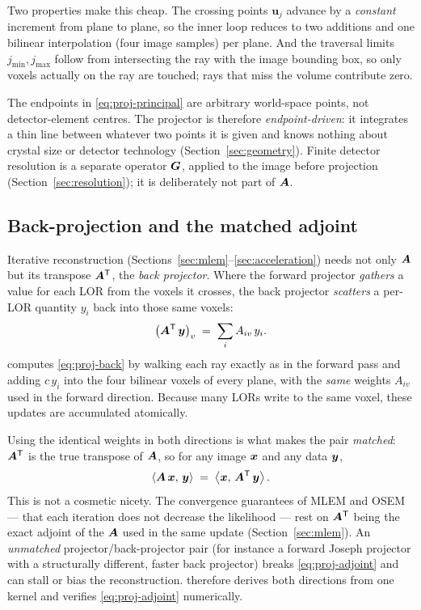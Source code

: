Two properties make this cheap. The crossing points $\bm{u}_j$ advance by a
\emph{constant} increment from plane to plane, so the inner loop reduces to two
additions and one bilinear interpolation (four image samples) per plane. And
the traversal limits $j_{\min},j_{\max}$ follow from intersecting the ray with
the image bounding box, so only voxels actually on the ray are touched; rays
that miss the volume contribute zero.

\begin{remark}
The endpoints in \eqref{eq:proj-principal} are arbitrary world-space points, not
detector-element centres. The projector is therefore \emph{endpoint-driven}: it
integrates a thin line between whatever two points it is given and knows nothing
about crystal size or detector technology (Section~\ref{sec:geometry}). Finite
detector resolution is a separate operator $\bm{G}$, applied to the image before
projection (Section~\ref{sec:resolution}); it is deliberately not part of
$\bm{A}$.
\end{remark}

\subsection{Back-projection and the matched adjoint}
\label{sec:projection:adjoint}

Iterative reconstruction (Sections~\ref{sec:mlem}--\ref{sec:acceleration})
needs not only $\bm{A}$ but its transpose $\bm{A}^{\mathsf{T}}$, the \emph{back projector}.
Where the forward projector \emph{gathers} a value for each LOR from the voxels
it crosses, the back projector \emph{scatters} a per-LOR quantity $y_i$ back
into those same voxels:
\begin{equation}
  \bigl(\bm{A}^{\mathsf{T}}\,\bm{y}\bigr)_v \;=\; \sum_i A_{iv}\,y_i .
  \label{eq:proj-back}
\end{equation}
 computes \eqref{eq:proj-back} by walking each ray exactly as in
the forward pass and adding $c\,y_i$ into the four bilinear voxels of every
plane, with the \emph{same} weights $A_{iv}$ used in the forward direction.
Because many LORs write to the same voxel, these updates are accumulated
atomically.

Using the identical weights in both directions is what makes the pair
\emph{matched}: $\bm{A}^{\mathsf{T}}$ is the true transpose of $\bm{A}$, so for any image $\bm{x}$
and any data $\bm{y}$,
\begin{equation}
  \left\langle \bm{A}\,\bm{x},\, \bm{y}\right\rangle \;=\; \left\langle \bm{x},\, \bm{A}^{\mathsf{T}}\,\bm{y}\right\rangle .
  \label{eq:proj-adjoint}
\end{equation}
This is not a cosmetic nicety. The convergence guarantees of MLEM and OSEM ---
that each iteration does not decrease the likelihood --- rest on $\bm{A}^{\mathsf{T}}$ being
the exact adjoint of the $\bm{A}$ used in the same update
(Section~\ref{sec:mlem}). An \emph{unmatched} projector/back-projector pair
(for instance a forward Joseph projector with a structurally different,
faster back projector) breaks \eqref{eq:proj-adjoint} and can stall or bias the
reconstruction.  therefore derives both directions from one
kernel and verifies \eqref{eq:proj-adjoint} numerically.

